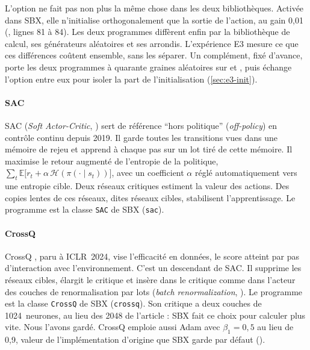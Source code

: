 L'option ne fait pas non plus la même chose dans les deux bibliothèques. Activée dans SBX, elle n'initialise
orthogonalement que la sortie de l'action, au gain 0,01 (, lignes 81 à 84). Les deux
programmes diffèrent enfin par la bibliothèque de calcul, ses générateurs aléatoires et ses arrondis.
L'expérience E3 mesure ce que ces différences coûtent ensemble, sans les séparer. Un complément, fixé
d'avance, porte les deux programmes à quarante graines aléatoires sur  et , puis
échange l'option entre eux pour isoler la part de l'initialisation (\cref{sec:e3-init}).

\paragraph{SAC}
SAC (\emph{Soft Actor-Critic}, \cite{haarnoja2018sac}) sert de référence \enquote{hors politique}
(\emph{off-policy}) en contrôle continu depuis 2019. Il garde toutes les transitions vues dans une mémoire de
rejeu et apprend à chaque pas sur un lot tiré de cette mémoire. Il maximise le retour augmenté de l'entropie de
la politique, $\sum_t \mathbb{E}\bigl[r_t + \alpha\,\mathcal{H}(\pi(\cdot\mid s_t))\bigr]$, avec un
coefficient $\alpha$ réglé automatiquement vers une entropie cible. Deux réseaux critiques estiment la valeur
des actions. Des copies lentes de ces réseaux, dites réseaux cibles, stabilisent l'apprentissage. Le programme
est la classe \texttt{SAC} de SBX (\texttt{sac}).

\paragraph{CrossQ}
CrossQ \parencite{bhatt2024crossq}, paru à ICLR~2024, vise l'efficacité en données, le score atteint par pas
d'interaction avec l'environnement. C'est un descendant de SAC. Il supprime les réseaux cibles, élargit le
critique et insère dans le critique comme dans l'acteur des couches de renormalisation par lots (\emph{batch
renormalization}, \cite{ioffe2017batchrenorm}). Le programme est la classe \texttt{CrossQ} de SBX (\texttt{crossq}). Son critique a deux
couches de \num{1024}~neurones, au lieu des \num{2048} de l'article : SBX fait ce choix pour calculer plus vite.
Nous l'avons gardé. CrossQ emploie aussi Adam avec $\beta_1 = 0{,}5$ au lieu de 0,9, valeur de l'implémentation
d'origine que SBX garde par défaut ().


